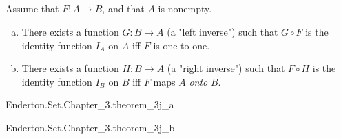 \documentclass{report}
\begin{document}
\subsection{}%

  \begin{theorem}[3J]
    Assume that $F \colon A \rightarrow B$, and that $A$ is nonempty.
    \begin{enumerate}[(a)]
      \item There exists a function $G \colon B \rightarrow A$
        (a "left inverse") such that $G \circ F$ is the identity function $I_A$
        on $A$ iff $F$ is one-to-one.
      \item There exists a function $H \colon B \rightarrow A$
        (a "right inverse") such that $F \circ H$ is the identity function $I_B$
        on $B$ iff $F$ maps $A$ \textit{onto} $B$.
    \end{enumerate}
  \end{theorem}

    {Enderton.Set.Chapter\_3.theorem\_3j\_a}

    {Enderton.Set.Chapter\_3.theorem\_3j\_b}
\end{document}

